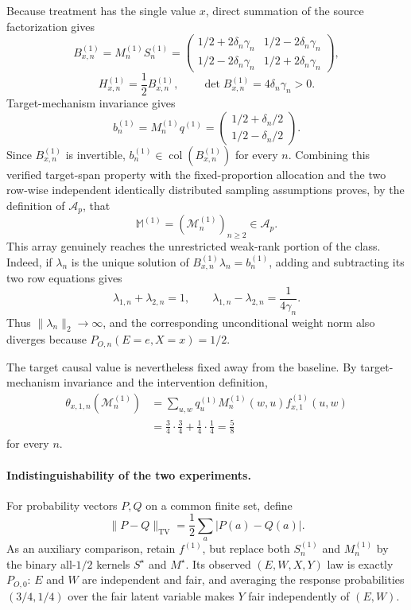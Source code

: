 Because treatment has the single value \(x\), direct summation of the source factorization gives
\[
B^{(1)}_{x,n}=M^{(1)}_nS^{(1)}_n=
\begin{pmatrix}
1/2+2\delta_n\gamma_n&1/2-2\delta_n\gamma_n\\
1/2-2\delta_n\gamma_n&1/2+2\delta_n\gamma_n
\end{pmatrix},
\]
\[
H^{(1)}_{x,n}=\frac12B^{(1)}_{x,n},
\qquad
\det B^{(1)}_{x,n}=4\delta_n\gamma_n>0.
\]
Target-mechanism invariance gives
\[
b^{(1)}_n=M^{(1)}_nq^{(1)}=
\begin{pmatrix}1/2+\delta_n/2\\1/2-\delta_n/2\end{pmatrix}.
\]
Since \(B^{(1)}_{x,n}\) is invertible, \(b^{(1)}_n\in\operatorname{col}(B^{(1)}_{x,n})\) for every \(n\). Combining this verified target-span property with the fixed-proportion allocation and the two row-wise independent identically distributed sampling assumptions proves, by the definition of \(\mathcal A_p\), that
\[
\mathbb M^{(1)}=(\mathcal M^{(1)}_n)_{n\ge2}\in\mathcal A_p.
\]
This array genuinely reaches the unrestricted weak-rank portion of the class. Indeed, if \(\lambda_n\) is the unique solution of \(B^{(1)}_{x,n}\lambda_n=b^{(1)}_n\), adding and subtracting its two row equations gives
\[
\lambda_{1,n}+\lambda_{2,n}=1,
\qquad
\lambda_{1,n}-\lambda_{2,n}=\frac{1}{4\gamma_n}.
\]
Thus \(\lVert\lambda_n\rVert_2\to\infty\), and the corresponding unconditional weight norm also diverges because \(P_{O,n}(E=e,X=x)=1/2\).

The target causal value is nevertheless fixed away from the baseline. By target-mechanism invariance and the intervention definition,
\[
\begin{split}
\theta_{x,1,n}(\mathcal M^{(1)}_n)
&=\sum_{u,w}q^{(1)}_uM^{(1)}_n(w,u)f^{(1)}_{x,1}(u,w)\\
&=\frac34\cdot\frac34+\frac14\cdot\frac14
=\frac58
\end{split}
\]
for every \(n\).

\paragraph{Indistinguishability of the two experiments.}
For probability vectors \(P,Q\) on a common finite set, define
\[
\lVert P-Q\rVert_{\mathrm{TV}}=\frac12\sum_a|P(a)-Q(a)|.
\]
As an auxiliary comparison, retain \(f^{(1)}\), but replace both \(S^{(1)}_n\) and \(M^{(1)}_n\) by the binary all-\(1/2\) kernels \(S^{\star}\) and \(M^{\star}\). Its observed \((E,W,X,Y)\) law is exactly \(P_{O,0}\): \(E\) and \(W\) are independent and fair, and averaging the response probabilities \((3/4,1/4)\) over the fair latent variable makes \(Y\) fair independently of \((E,W)\).

